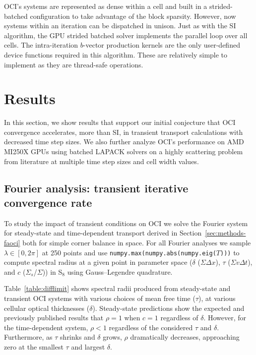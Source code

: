 OCI's systems are represented as dense within a cell and built in a strided-batched configuration to take advantage of the block sparsity.
However, now systems within an iteration can be dispatched in unison.
Just as with the SI algorithm, the GPU strided batched solver implements the parallel loop over all cells.
The intra-iteration $b$-vector production kernels are the only user-defined device functions required in this algorithm. These are relatively simple to implement as they are thread-safe operations.


\section{Results}
\label{sec:results}

In this section, we show results that support our initial conjecture that OCI convergence accelerates, more than SI, in transient transport calculations with decreased time step sizes.
We also further analyze OCI's performance on AMD MI250X GPUs using batched LAPACK solvers on a highly scattering problem from literature at multiple time step sizes and cell width values.

\subsection{Fourier analysis: transient iterative convergence rate}
\label{sec:results-faoci}

To study the impact of transient conditions on OCI we solve the Fourier system for steady-state and time-dependent transport derived in Section~\ref{sec:methods-faoci} both for simple corner balance in space.
For all Fourier analyses we sample $\lambda \in [0,2\pi]$ at \num{250} points and use \texttt{numpy.max(numpy.abs(numpy.eig(}$T$\texttt{)))} to compute spectral radius at a given point in parameter space ($\delta$ ($\Sigma\Delta x$), $\tau$ ($\Sigma v\Delta t$), and $c$ ($\Sigma_s$/$\Sigma$)) in S$_{8}$ using Gauss--Legendre quadrature.

Table~\ref{table:difflimit} shows spectral radii produced from steady-state and transient OCI systems with various choices of mean free time ($\tau$), at various cellular optical thicknesses ($\delta$).
Steady-state predictions show the expected and previously published results that $\rho=1$ when $c=1$ regardless of $\delta$.
However, for the time-dependent system, $\rho<1$ regardless of the considered $\tau$ and $\delta$.
Furthermore, as $\tau$ shrinks and $\delta$ grows, $\rho$ dramatically decreases, approaching zero at the smallest $\tau$ and largest $\delta$.

